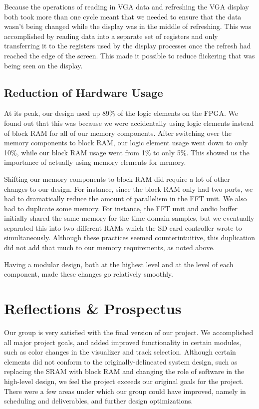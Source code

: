 \documentclass{article}
\begin{document}
Because the operations of reading in VGA data and refreshing the VGA display both 
took more than one cycle meant that we needed to ensure that the data wasn't being 
changed while the display was in the middle of refreshing. This was accomplished by 
reading data into a separate set of registers and only transferring it to the registers 
used by the display processes once the refresh had reached the edge of the screen.  
This made it possible to reduce flickering that was being seen on the display.

\subsection{Reduction of Hardware Usage}

At its peak, our design used up 89\% of the logic elements on the FPGA. We found out 
that this was because we were accidentally using logic elements instead of block 
RAM for all of our memory components. After switching over the memory components 
to block RAM, our logic element usage went down to only 10\%, while our block RAM 
usage went from 1\% to only 5\%. This showed us the importance of actually using 
memory elements for memory.

Shifting our memory components to block RAM did require a lot of other changes to 
our design. For instance, since the block RAM only had two ports, we had to 
dramatically reduce the amount of parallelism in the FFT unit. We also had to 
duplicate some memory. For instance, the FFT unit and audio buffer initially shared 
the same memory for the time domain samples, but we eventually separated this into 
two different RAMs which the SD card controller wrote to simultaneously. Although 
these practices seemed counterintuitive, this duplication did not add that much to our 
memory requirements, as noted above. 

Having a modular design, both at the highest level and at the level of each
component, made these changes go relatively smoothly.

\section{Reflections \& Prospectus}

Our group is very satisfied with the final version of our project. We accomplished all 
major project goals, and added improved functionality in certain modules, such as 
color changes in the visualizer and track selection. Although certain elements did not 
conform to the originally-delineated system design, such as replacing the SRAM with 
block RAM and changing the role of software in the high-level design, we feel the 
project exceeds our original goals for the project. There were a few areas under 
which our group could have improved, namely in scheduling and deliverables, and 
further design optimizations.
\end{document}
